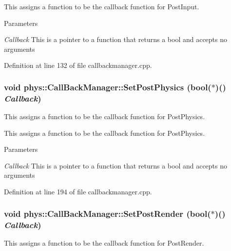 This assigns a function to be the callback function for PostInput. 
\begin{DoxyParams}{Parameters}
\item[{\em Callback}]This is a pointer to a function that returns a bool and accepts no arguments \end{DoxyParams}


Definition at line 132 of file callbackmanager.cpp.

\hypertarget{classphys_1_1CallBackManager_a17687cd04807dfc80a25847be830c2f2}{
\subsubsection[{SetPostPhysics}]{\setlength{\rightskip}{0pt plus 5cm}void phys::CallBackManager::SetPostPhysics (bool($\ast$)() {\em Callback})}}
\label{d1/d47/classphys_1_1CallBackManager_a17687cd04807dfc80a25847be830c2f2}


This assigns a function to be the callback function for PostPhysics. 

This assigns a function to be the callback function for PostPhysics. 
\begin{DoxyParams}{Parameters}
\item[{\em Callback}]This is a pointer to a function that returns a bool and accepts no arguments \end{DoxyParams}


Definition at line 194 of file callbackmanager.cpp.

\hypertarget{classphys_1_1CallBackManager_afe6a91491f3872599d2c5784a902361a}{
\subsubsection[{SetPostRender}]{\setlength{\rightskip}{0pt plus 5cm}void phys::CallBackManager::SetPostRender (bool($\ast$)() {\em Callback})}}
\label{d1/d47/classphys_1_1CallBackManager_afe6a91491f3872599d2c5784a902361a}


This assigns a function to be the callback function for PostRender. 

